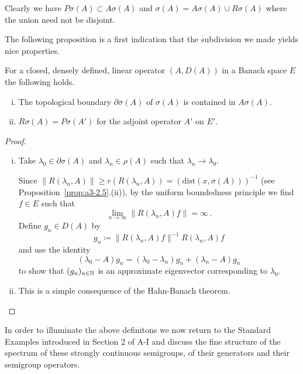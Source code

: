Clearly we have $P\sigma(A) \subset A\sigma(A)$ and $\sigma(A) = A\sigma(A) \cup R\sigma(A)$ where the union need not be disjoint.

The following proposition is a first indication that the subdivision we made yields nice properties.
\begin{proposition}\label{prop:a3-2.2}
For a closed, densely defined, linear operator $(A,D(A))$ in a Banach space $E$ the following holds.
\begin{enumerate}[(i)]

\item
The topological boundary $\partial\sigma(A)$ of $\sigma(A)$ is contained in $A\sigma(A)$.

\item
$R\sigma(A) = P\sigma(A')$ for the adjoint operator $A'$ on $E'$.

\end{enumerate}
\end{proposition}
\begin{proof}
\begin{enumerate}[(i), wide]

\item 
Take $\lambda_{0} \in \partial\sigma(A)$ and $\lambda_{n} \in \rho(A)$ such that $\lambda_{n} \to \lambda_{0}$.

Since $\|R(\lambda_{n},A)\| \geq r(R(\lambda_{n},A)) = (\text{dist}(x,\sigma(A)))^{-1}$ (see Proposition~\ref{prop:a3-2.5}.(ii)), by the uniform boundedness principle we find $f \in E$ such that
\[
\lim_{n \to \infty}\|R(\lambda_n ,A)f\| = \infty\,.
\]
Define $g_{n} \in D(A)$ by
\[
g_{n} \coloneqq \|R(\lambda_{n},A)f\|^{-1} R(\lambda_{n},A)f
\]
and use the identity
\[
(\lambda_{0} - A)g_{n} = (\lambda_{0} - \lambda_{n})g_{n} + (\lambda_{n} - A)g_{n}
\]
to show that $(g_{n})_{n \in \mathbb{N}}$ is an approximate eigenvector corresponding to $\lambda_{0}$.

\item 
This is a simple consequence of the Hahn-Banach theorem.
\end{enumerate}
\end{proof}
In order to illuminate the above definitons we now return to the Standard Examples introduced in Section 2 of A-I and discuss the fine structure of the spectrum of these strongly continuous semigroups, \ie of their generators and their semigroup operators.
